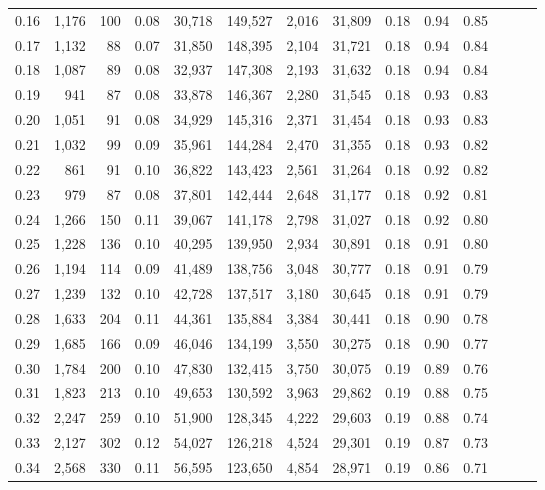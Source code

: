 \begin{tabular}{rrrrrrrrrrrrrr}
0.16 &  1,176 &  100 &  0.08 &   30,718 &  149,527 &   2,016 &  31,809 &  0.18 &  0.94 &      0.85 \\
0.17 &  1,132 &   88 &  0.07 &   31,850 &  148,395 &   2,104 &  31,721 &  0.18 &  0.94 &      0.84 \\
0.18 &  1,087 &   89 &  0.08 &   32,937 &  147,308 &   2,193 &  31,632 &  0.18 &  0.94 &      0.84 \\
0.19 &    941 &   87 &  0.08 &   33,878 &  146,367 &   2,280 &  31,545 &  0.18 &  0.93 &      0.83 \\
0.20 &  1,051 &   91 &  0.08 &   34,929 &  145,316 &   2,371 &  31,454 &  0.18 &  0.93 &      0.83 \\
0.21 &  1,032 &   99 &  0.09 &   35,961 &  144,284 &   2,470 &  31,355 &  0.18 &  0.93 &      0.82 \\
0.22 &    861 &   91 &  0.10 &   36,822 &  143,423 &   2,561 &  31,264 &  0.18 &  0.92 &      0.82 \\
0.23 &    979 &   87 &  0.08 &   37,801 &  142,444 &   2,648 &  31,177 &  0.18 &  0.92 &      0.81 \\
0.24 &  1,266 &  150 &  0.11 &   39,067 &  141,178 &   2,798 &  31,027 &  0.18 &  0.92 &      0.80 \\
0.25 &  1,228 &  136 &  0.10 &   40,295 &  139,950 &   2,934 &  30,891 &  0.18 &  0.91 &      0.80 \\
0.26 &  1,194 &  114 &  0.09 &   41,489 &  138,756 &   3,048 &  30,777 &  0.18 &  0.91 &      0.79 \\
0.27 &  1,239 &  132 &  0.10 &   42,728 &  137,517 &   3,180 &  30,645 &  0.18 &  0.91 &      0.79 \\
0.28 &  1,633 &  204 &  0.11 &   44,361 &  135,884 &   3,384 &  30,441 &  0.18 &  0.90 &      0.78 \\
0.29 &  1,685 &  166 &  0.09 &   46,046 &  134,199 &   3,550 &  30,275 &  0.18 &  0.90 &      0.77 \\
0.30 &  1,784 &  200 &  0.10 &   47,830 &  132,415 &   3,750 &  30,075 &  0.19 &  0.89 &      0.76 \\
0.31 &  1,823 &  213 &  0.10 &   49,653 &  130,592 &   3,963 &  29,862 &  0.19 &  0.88 &      0.75 \\
0.32 &  2,247 &  259 &  0.10 &   51,900 &  128,345 &   4,222 &  29,603 &  0.19 &  0.88 &      0.74 \\
0.33 &  2,127 &  302 &  0.12 &   54,027 &  126,218 &   4,524 &  29,301 &  0.19 &  0.87 &      0.73 \\
0.34 &  2,568 &  330 &  0.11 &   56,595 &  123,650 &   4,854 &  28,971 &  0.19 &  0.86 &      0.71 \\

\end{tabular}
